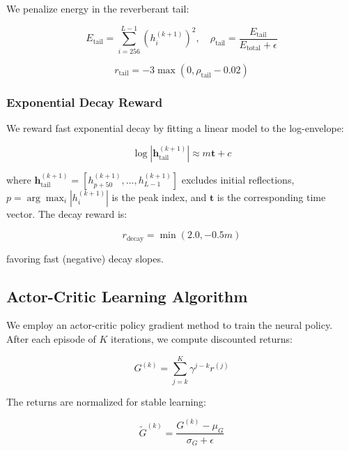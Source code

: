 We penalize energy in the reverberant tail:

\begin{equation}
E_\text{tail} = \sum_{i=256}^{L-1} (h_i^{(k+1)})^2, \quad \rho_\text{tail} = \frac{E_\text{tail}}{E_\text{total} + \epsilon}
\label{eq:tail_energy}
\end{equation}

\begin{equation}
r_\text{tail} = -3 \max(0, \rho_\text{tail} - 0.02)
\label{eq:tail_reward}
\end{equation}

\subsubsection{Exponential Decay Reward}

We reward fast exponential decay by fitting a linear model to the log-envelope:

\begin{equation}
\log |\mathbf{h}_\text{tail}^{(k+1)}| \approx m \mathbf{t} + c
\label{eq:decay_fit}
\end{equation}

\noindent where $\mathbf{h}_\text{tail}^{(k+1)} = [h_{p+50}^{(k+1)}, \ldots, h_{L-1}^{(k+1)}]$ excludes initial reflections, $p = \arg\max_i |h_i^{(k+1)}|$ is the peak index, and $\mathbf{t}$ is the corresponding time vector. The decay reward is:

\begin{equation}
r_\text{decay} = \min(2.0, -0.5m)
\label{eq:decay_reward}
\end{equation}

\noindent favoring fast (negative) decay slopes.

\subsection{Actor-Critic Learning Algorithm}
\label{subsec:learning}

We employ an actor-critic policy gradient method to train the neural policy. After each episode of $K$ iterations, we compute discounted returns:

\begin{equation}
G^{(k)} = \sum_{j=k}^{K} \gamma^{j-k} r^{(j)}
\label{eq:discounted_return}
\end{equation}

The returns are normalized for stable learning:

\begin{equation}
\tilde{G}^{(k)} = \frac{G^{(k)} - \mu_G}{\sigma_G + \epsilon}
\label{eq:normalized_returns}
\end{equation}

